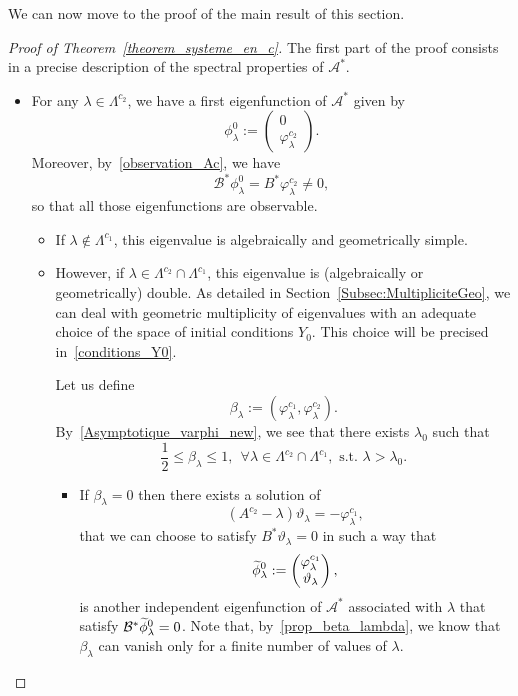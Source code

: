 \documentclass[10pt]{amsart}
\theoremstyle{definition}\newtheorem{defi}[theo]{Definition}\newtheorem{rema}[theo]{Remark}\newtheorem{exam}[theo]{Example}\newtheorem{exem}[theo]{Example}\newtheorem{nota}[theo]{Notation}
\newcommand{\fprop}[2]{\varphi^{#1}_{#2}}
\newcommand\As{\mathcal{A}^*}
\newcommand\Bs{\mathcal{B}^*}
\newcommand{\Fzp}{Y_0}
\let\oldtilde\tilde
\renewcommand*{\tilde}[1]{\mathchoice{\widetilde{#1}}{\widetilde{#1}}{\oldtilde{#1}}{\oldtilde{#1}}}\let\oldexists\exists
\renewcommand*{\exists}{\mathrel{\oldexists}}
\let\oldforall\forall
\renewcommand*{\forall}{\mathrel{\oldforall}}
\begin{document}
We can now move to the proof of the main result of this section.
\begin{proof}[Proof of Theorem~\ref{theorem_systeme_en_c}]
The first part of the proof consists in a precise description of the spectral properties of $\As$.
\begin{itemize}
\item For any $\lambda\in \Lambda^{c_2}$, we have a first eigenfunction of $\As$ given by
\begin{equation}\label{systeme_en_c_fp1}
\phi_{\lambda}^0 :=
\begin{pmatrix} 
0 \\ \fprop{c_2}{\lambda}
\end{pmatrix}.
\end{equation}
Moreover, by~\eqref{observation_Ac}, we have
\[
\Bs \phi_{\lambda}^0= B^*\fprop{c_2}{\lambda} \neq 0,
\]
so that all those eigenfunctions are observable.
\begin{itemize}
\item If $\lambda\not\in \Lambda^{c_1}$, this eigenvalue is algebraically and geometrically simple.
\item However, if $\lambda\in \Lambda^{c_2}\cap \Lambda^{c_1}$, this eigenvalue is (algebraically or geometrically) double. As detailed in Section~\ref{Subsec:MultipliciteGeo}, we can deal with geometric multiplicity of eigenvalues with an adequate choice of the space of initial conditions $\Fzp$. This choice will be precised in~\eqref{conditions_Y0}.

Let us define
\begin{equation}\label{def_beta_lambda}
\beta_\lambda:=(\fprop{c_1}{\lambda},\fprop{c_2}{\lambda}).
\end{equation}
By~\eqref{Asymptotique_varphi_new}, we see that there exists $\lambda_0$ such that
\begin{equation}\label{prop_beta_lambda}
\frac{1}{2} \leq \beta_\lambda\leq 1, \ \ \forall \lambda\in \Lambda^{c_2}\cap \Lambda^{c_1}, \text{ s.t. } \lambda>\lambda_0.
\end{equation}
\begin{itemize}
\item If $\beta_\lambda=0$ then there exists a solution of
\[
(A^{c_2}-\lambda) \vartheta_\lambda = - \fprop{c_1}{\lambda},
\]
that we can choose to satisfy $B^* \vartheta_\lambda=0$ in such a way that
\[
\tilde{\phi}_\lambda^0:=
\begin{pmatrix} \fprop{c_1}{\lambda} \\ \vartheta_\lambda
\end{pmatrix},
\]
is another independent eigenfunction of $\As$ associated with $\lambda$ that satisfy $\Bs \tilde{\phi}^0_\lambda=0$. Note that, by~\eqref{prop_beta_lambda}, we know that $\beta_\lambda$ can vanish only for a finite number of values of $\lambda$.


\end{itemize}
\end{itemize}
\end{itemize}
\end{proof}
\end{document}

